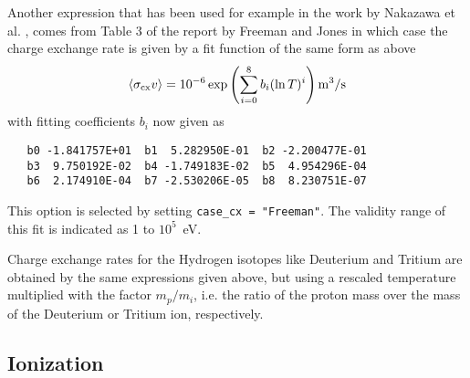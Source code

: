 \documentclass[amsmath,amssymb,a4]{revtex4}
\begin{document}
Another expression that has been used for example in the work by Nakazawa et al. \cite{nakazawa2000}, comes from Table 3 of the report by Freeman and Jones \cite{freeman1974} in which case the charge exchange rate is given by a fit function of the same form as above
\begin{equation}\label{charge_exchange_FJ}
    \langle\sigma_{\rm cx} v\rangle = 10^{-6} \exp\left( \sum_{i=0}^8 b_i (\ln T)^i \right)  {\rm m}^3/{\rm s}
\end{equation}
with fitting coefficients $b_i$ now given as
\begin{small}\begin{verbatim}
   b0 -1.841757E+01  b1  5.282950E-01  b2 -2.200477E-01
   b3  9.750192E-02  b4 -1.749183E-02  b5  4.954296E-04
   b6  2.174910E-04  b7 -2.530206E-05  b8  8.230751E-07
\end{verbatim}\end{small}
This option is selected by setting {\tt case\_cx = "Freeman"}. The validity range of this fit is indicated as 1 to $10^5$~eV.

Charge exchange rates for the Hydrogen isotopes like Deuterium and Tritium are obtained by the same expressions given above, but using a rescaled temperature multiplied with the factor $m_p/m_i$, i.e. the ratio of the proton mass over the mass of the Deuterium or Tritium ion, respectively.


\subsection{Ionization}
\end{document}
